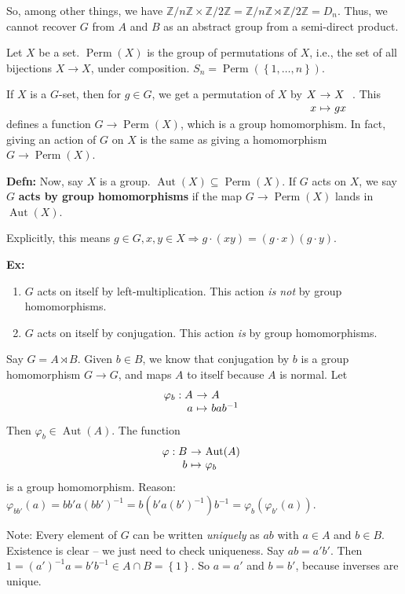 \documentclass[10pt,letterpaper]{article}
\newcommand{\n}{\hfill\break}
\newcommand{\hangblock}[2]{\par\noindent\settowidth{\hangindent}{\textbf{#1: }}\textbf{#1: }\!\!\!#2}
\newcommand{\defn}[1]{\hangblock{Defn}{#1}}
\newcommand{\ex}[1]{\hangblock{Ex}{#1}}
\newcommand{\set}[1]{\left\{#1\right\}}
\newcommand{\integers}{\mathbb{Z}}
\newcommand{\Z}{\integers}
\newcommand{\inv}{^{-1}}
\newcommand{\map}[4]{\!\!\!\begin{array}[t]{rcl}#1 & \!\!\!\!\to & \!\!\!\!#2\\ #3 & \!\!\!\!\mapsto & \!\!\!\!#4\end{array}}
\DeclareMathOperator{\Aut}{Aut}
\DeclareMathOperator{\Perm}{Perm}
\begin{document}
\par\noindent
So, among other things, we have $\Z/n\Z\times\Z/2\Z=\Z/n\Z\rtimes\Z/2\Z=D_{n}$. Thus, we cannot recover $G$ from $A$ and $B$ as an abstract group from a semi-direct product.\n

\par\noindent
Let $X$ be a set. $\Perm(X)$ is the group of permutations of $X$, i.e., the set of all bijections $X\to{}X$, under composition.\n
$S_{n}=\Perm(\set{1,\ldots,n})$.\n

\par\noindent
If $X$ is a $G$-set, then for $g\in{}G$, we get a permutation of $X$ by $\map{X}{X}{x}{gx}$.\n
This defines a function $G\to\Perm(X)$, which is a group homomorphism. In fact, giving an action of $G$ on $X$ is the same as giving a homomorphism $G\to\Perm(X)$.\n

\defn{
	Now, say $X$ is a group. $\Aut(X)\subseteq\Perm(X)$. If $G$ acts on $X$, we say $G$ \textbf{acts by group homomorphisms} if the map $G\to\Perm(X)$ lands in $\Aut(X)$.\n
}

\par\noindent
Explicitly, this means $g\in{}G,x,y\in{}X\Rightarrow{}g\cdot(xy)=(g\cdot{}x)(g\cdot{}y)$.\n

\ex{
	\begin{enumerate}[leftmargin=4\parindent]
		\item $G$ acts on itself by left-multiplication. This action \textit{is not} by group homomorphisms.
		\item $G$ acts on itself by conjugation. This action \textit{is} by group homomorphisms.
	\end{enumerate}
}

\par\noindent
Say $G=A\rtimes{}B$. Given $b\in{}B$, we know that conjugation by $b$ is a group homomorphism $G\to{}G$, and maps $A$ to itself because $A$ is normal. Let
\[
	\map{\varphi_{b}:A}{A}{a}{bab\inv}
\]
Then $\varphi_{b}\in\Aut(A)$. The function
\[
	\map{\varphi:B}{\Aut(A)}{b}{\varphi_{b}}
\]
is a group homomorphism. Reason: $\varphi_{bb'}(a)=bb'a(bb')\inv=b(b'a(b')\inv)b\inv=\varphi_{b}(\varphi_{b'}(a))$.\n

\par\noindent
Note: Every element of $G$ can be written \textit{uniquely} as $ab$ with $a\in{}A$ and $b\in{}B$.\n
Existence is clear -- we just need to check uniqueness.\n
Say $ab=a'b'$. Then $1=(a')\inv{}a=b'b\inv\in{}A\cap{}B=\set{1}$. So $a=a'$ and $b=b'$, because inverses are unique.\n
\end{document}
